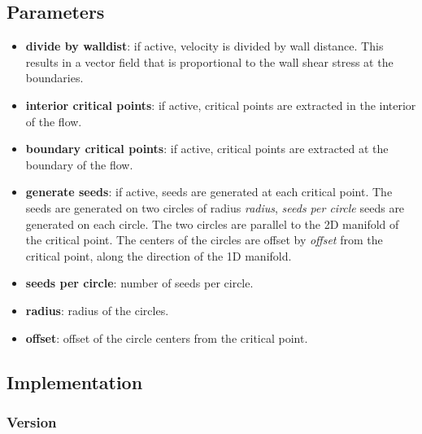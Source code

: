 \subsection{Parameters}
\begin{itemize}

\item
  \textbf{divide by walldist}: if active, velocity is divided by wall distance. This results in a vector field that is proportional to the wall shear stress at the boundaries.

\item
  \textbf{interior critical points}: if active, critical points are extracted in the interior of the flow.

\item
  \textbf{boundary critical points}: if active, critical points are extracted at the boundary of the flow.

\item
  \textbf{generate seeds}: if active, seeds are generated at each critical point. The seeds are generated on two circles of radius \emph{radius}, \emph{seeds per circle} seeds are generated on each circle. The two circles are parallel to the 2D manifold of the critical point. The centers of the circles are offset by \emph{offset} from the critical point, along the direction of the 1D manifold.

\item
  \textbf{seeds per circle}: number of seeds per circle.

\item
  \textbf{radius}: radius of the circles.

\item
  \textbf{offset}: offset of the circle centers from the critical point.

\end{itemize}


\subsection{Implementation}


\subsubsection{Version}

